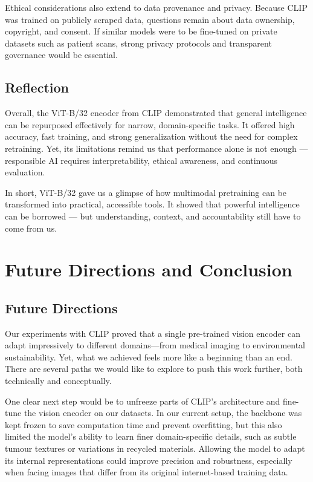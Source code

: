 \documentclass[12pt]{article}
\begin{document}
Ethical considerations also extend to data provenance and privacy. Because CLIP was trained on publicly scraped data, questions remain about data ownership, copyright, and consent. If similar models were to be fine-tuned on private datasets such as patient scans, strong privacy protocols and transparent governance would be essential.

\subsection{Reflection}
Overall, the ViT-B/32 encoder from CLIP demonstrated that general intelligence can be repurposed effectively for narrow, domain-specific tasks. It offered high accuracy, fast training, and strong generalization without the need for complex retraining. Yet, its limitations remind us that performance alone is not enough — responsible AI requires interpretability, ethical awareness, and continuous evaluation.  
\vspace{0.3em}

In short, ViT-B/32 gave us a glimpse of how multimodal pretraining can be transformed into practical, accessible tools. It showed that powerful intelligence can be borrowed — but understanding, context, and accountability still have to come from us.

\section{Future Directions and Conclusion}

\subsection{Future Directions}
Our experiments with CLIP proved that a single pre-trained vision encoder can adapt impressively to different domains---from medical imaging to environmental sustainability. Yet, what we achieved feels more like a beginning than an end. There are several paths we would like to explore to push this work further, both technically and conceptually.

One clear next step would be to unfreeze parts of CLIP’s architecture and fine-tune the vision encoder on our datasets. In our current setup, the backbone was kept frozen to save computation time and prevent overfitting, but this also limited the model’s ability to learn finer domain-specific details, such as subtle tumour textures or variations in recycled materials. Allowing the model to adapt its internal representations could improve precision and robustness, especially when facing images that differ from its original internet-based training data.
\end{document}
